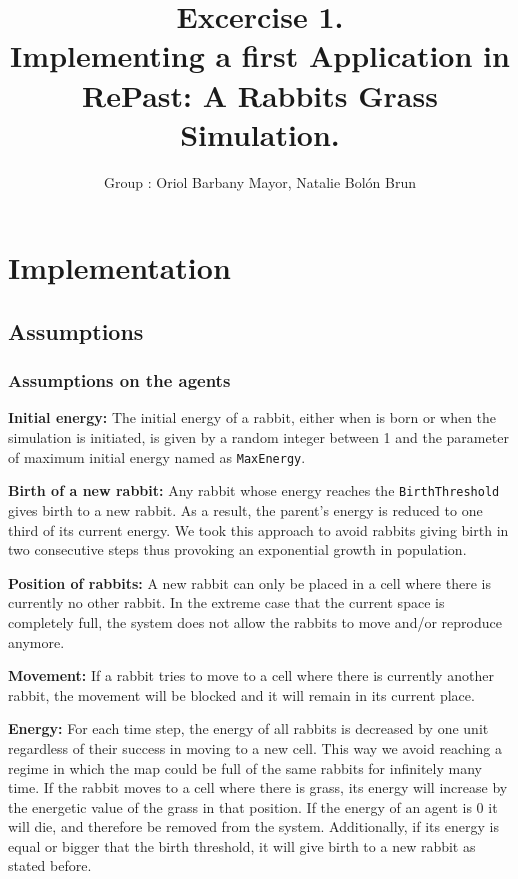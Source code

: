 \documentclass[11pt]{article}
\title{\bf Excercise 1.\\ Implementing a first Application in RePast: A Rabbits Grass Simulation.}
\author{Group \textnumero 54: Oriol Barbany Mayor, Natalie Bolón Brun}
\begin{document}
\maketitle

\section{Implementation}

\subsection{Assumptions}
\subsubsection{Assumptions on the \textbf{agents}}

\textbf{Initial energy: }The initial energy of a rabbit, either when is born or when the simulation is initiated, is given by a random integer between 1 and the parameter of maximum initial energy named as \texttt{MaxEnergy}.
    
\textbf{Birth of a new rabbit: } Any rabbit whose energy reaches the \texttt{BirthThreshold} gives birth to a new rabbit. As a result, the parent's energy is reduced to one third of its current energy. We took this approach to avoid rabbits giving birth in two consecutive steps thus provoking an exponential growth in population.

\textbf{Position of rabbits: } A new rabbit can only be placed in a cell where there is currently no other rabbit. In the extreme case that the current space is completely full, the system does not allow the rabbits to move and/or reproduce anymore.
    
\textbf{Movement: } If a rabbit tries to move to a cell where there is currently another rabbit, the movement will be blocked and it will remain in its current place. 
    
\textbf{Energy: } For each time step, the energy of all rabbits is decreased by one unit regardless of their success in moving to a new cell. This way we avoid reaching a regime in which the map could be full of the same rabbits for infinitely many time. If the rabbit moves to a cell where there is grass, its energy will increase by the energetic value of the grass in that position. If the energy of an agent is 0 it will die, and therefore be removed from the system. Additionally, if its energy is equal or bigger that the birth threshold, it will give birth to a new rabbit as stated before.
\end{document}
